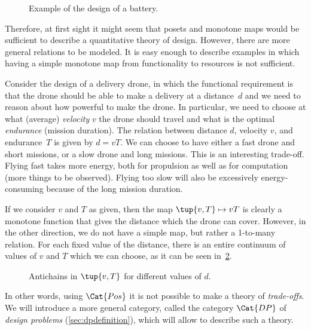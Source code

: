 \begin{figure}[h!]
    \centering
    \caption{Example of the design of a battery. \label{fig:battery-example}}
\end{figure}

Therefore, at first sight it might seem that posets and monotone maps
would be sufficient to describe a quantitative theory of design.
However, there are more general relations to be modeled. It is easy enough
to describe examples in which having a simple monotone map from functionality
to resources is not sufficient.

\begin{example}
Consider the design of a delivery drone, in which the functional
requirement is that the drone should be able to make a delivery
at a distance~$d$ and we need to reason about how powerful to make
the drone. In particular, we need to choose at what (average) \emph{velocity} $v$ the drone  should travel and what is the optimal \emph{endurance} (mission duration). The relation between distance $d$, velocity $v$, and endurance~$T$ is given by $d=vT$. We can choose to have either a fast drone and short missions, or a slow drone and long missions. This is an interesting trade-off. Flying fast takes more energy, both for propulsion as well as for computation (more things to be observed). Flying too slow will also be excessively energy-consuming because of the long mission duration.

If we consider $v$ and $T$ as given, then the map $\tup{v,T} \mapsto vT$ is clearly a monotone function that gives the distance which the drone can cover. However, in the other direction, we do not have a simple map, but rather a 1-to-many relation. For each fixed value of the distance, there is an entire continuum of values of $v$ and $T$ which we can choose, as it can be seen in~\cref{fig:drone-example-antichain}.

\begin{figure}[h!]
    \centering
    \caption{Antichains in $\tup{v,T}$ for different values of $d$. \label{fig:drone-example}
    \label{fig:drone-example-antichain}}
\end{figure}

\end{example}

In other words, using $\Cat{Pos}$ it is not possible to make a theory of \emph{trade-offs}. We will introduce a more general category, called  the category $\Cat{DP}$ of
\emph{design problems} (\cref{sec:dpdefinition}), which will allow to describe such a theory.
    
